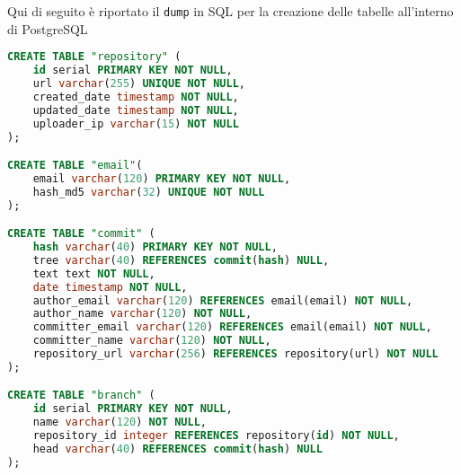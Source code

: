 Qui di seguito è riportato il \verb|dump| in SQL per la creazione delle tabelle all'interno di PostgreSQL
\begin{lstlisting}[language=SQL]
CREATE TABLE "repository" (
    id serial PRIMARY KEY NOT NULL,
    url varchar(255) UNIQUE NOT NULL,
    created_date timestamp NOT NULL,
    updated_date timestamp NOT NULL,
	uploader_ip varchar(15) NOT NULL
);

CREATE TABLE "email"(
    email varchar(120) PRIMARY KEY NOT NULL,
    hash_md5 varchar(32) UNIQUE NOT NULL
);

CREATE TABLE "commit" (
    hash varchar(40) PRIMARY KEY NOT NULL,
    tree varchar(40) REFERENCES commit(hash) NULL,
    text text NOT NULL,
    date timestamp NOT NULL,
    author_email varchar(120) REFERENCES email(email) NOT NULL,
    author_name varchar(120) NOT NULL,
    committer_email varchar(120) REFERENCES email(email) NOT NULL,
    committer_name varchar(120) NOT NULL,
    repository_url varchar(256) REFERENCES repository(url) NOT NULL 
);

CREATE TABLE "branch" (
    id serial PRIMARY KEY NOT NULL,
    name varchar(120) NOT NULL,
    repository_id integer REFERENCES repository(id) NOT NULL,
    head varchar(40) REFERENCES commit(hash) NULL
);
\end{lstlisting}